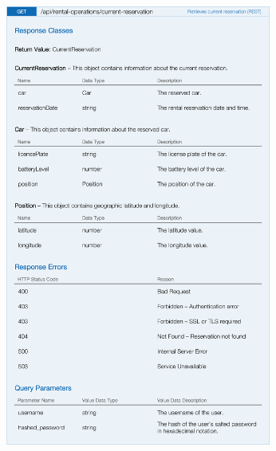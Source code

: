 \begin{figure}[H]
	\noindent
    	\centering
    	\includegraphics[height=550px, keepaspectratio]{apitables/APICurrentReservation.png}
    	\label{fig:api-current-reservation}
\end{figure}

